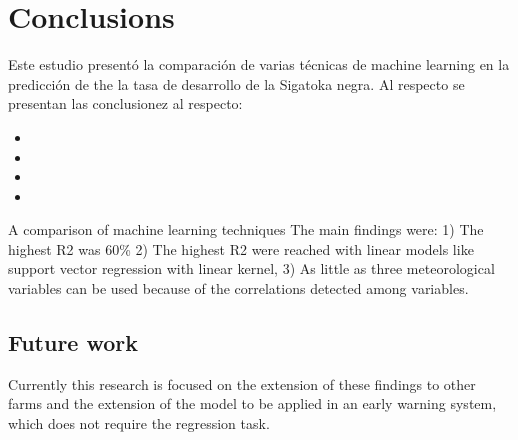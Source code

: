 \section{Conclusions}
\label{sec:concl}
Este estudio presentó la comparación de varias técnicas de machine learning en la predicción de the la tasa de desarrollo de la Sigatoka negra. Al respecto se presentan las conclusionez al respecto:
\begin{itemize}
\item 
\item 
\item 
\item 

\end{itemize}

A comparison of machine learning techniques
The main findings were: 1) The highest R2 was 60\% 2) The highest R2 were reached with linear models like support vector regression with linear kernel, 3) As little as three meteorological variables can be used because of the correlations detected among variables. 

\subsection{Future work}
Currently this research is focused on the extension of these findings to other farms and the extension of the model to be applied in an early warning system, which does not require the regression task.

